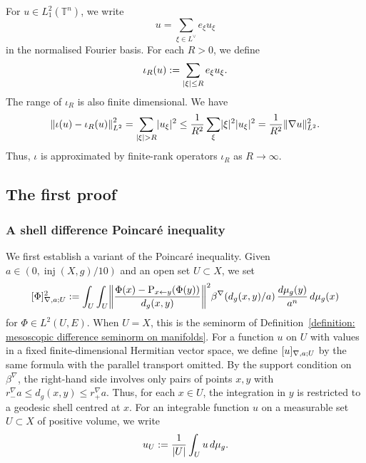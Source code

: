 \documentclass[a4paper,oneside,12pt]{amsart}
\theoremstyle{plain}
\theoremstyle{definition}
\theoremstyle{remark}
\DeclarePairedDelimiter{\abs}{\lvert}{\rvert}
\DeclarePairedDelimiter{\norm}{\lVert}{\rVert}
\DeclarePairedDelimiter{\seminorm}{\lbrack}{\rbrack}
\DeclareMathOperator{\injectivityradius}{inj}
\newcommand{\dvol}{d\mu}
\newcommand{\paralleltransport}[2]{\operatorname{P}_{#2 \gets #1}}
\newcommand{\flattorus}{\mathbb{T}^n}
\newcommand{\Lattice}{L}
\newcommand{\duallattice}[1]{#1^{\vee}}
\newcommand{\Ltwonorm}[2][L^2]{\norm{#2}_{#1}}
\newcommand{\mesoscopicdifferenceseminormLocal}[3][a]{\seminorm{#3}_{\nabla,#1;#2}}
\newcommand{\cutoff}{\beta}
\newcommand{\cutoffnabla}{\cutoff^{\nabla}}
\begin{document}
For $u \in L^2_1(\flattorus)$, we write
\begin{equation}
  u = \sum_{\xi \in \duallattice{\Lattice}} e_{\xi} u_{\xi}
\end{equation}
in the normalised Fourier basis.
For each $R > 0$, we define
\begin{equation}
  \iota_R(u) := \sum_{\abs{\xi} \le R} e_{\xi} u_{\xi}.
\end{equation}
The range of $\iota_R$ is also finite dimensional.
We have
\begin{equation}
  \norm*{\iota(u) - \iota_R(u)}^2_{L^2} = \sum_{\abs{\xi} > R} \abs{u_{\xi}}^2 \le \frac{1}{R^2} \sum_{\xi} \abs{\xi}^2 \abs{u_{\xi}}^2 = \frac{1}{R^2}\Ltwonorm{\nabla u}^2.
\end{equation}
Thus, $\iota$ is approximated by finite-rank operators $\iota_R$ as $R \to \infty$.

\subsection{The first proof}

\subsubsection{A shell difference Poincar\'e inequality}

We first establish a variant of the Poincar\'e inequality.
Given $a \in (0,\injectivityradius(X,g)/10)$ and an open set $U \subset X$, we set
\begin{equation}
  \mesoscopicdifferenceseminormLocal{U}{\Phi}^2 := \int_U \int_U \norm*{\frac{\Phi(x) - \paralleltransport{y}{x}(\Phi(y))}{d_g(x,y)}}^2 \cutoffnabla(d_g(x,y)/a) \,\frac{\dvol_g(y)}{a^n} \,\dvol_g(x)
\end{equation}
for $\Phi \in L^2(U,E)$.
When $U = X$, this is the seminorm of Definition~\ref{definition: mesoscopic difference seminorm on manifolds}.
For a function $u$ on $U$ with values in a fixed finite-dimensional Hermitian vector space, we define $\mesoscopicdifferenceseminormLocal{U}{u}$ by the same formula with the parallel transport omitted.
By the support condition on $\cutoffnabla$, the right-hand side
involves only pairs of points $x,y$ with $r_-^{\nabla}a \le d_g(x,y) \le r_+^{\nabla}a$.
Thus, for each $x\in U$, the integration in $y$ is restricted
to a geodesic shell centred at $x$.
For an integrable function $u$ on a measurable set $U \subset X$ of positive volume, we write
\begin{equation}
  u_U := \frac{1}{\abs{U}} \int_U u \,\dvol_g.
\end{equation}
\end{document}
